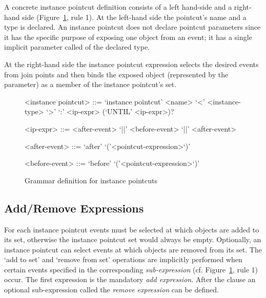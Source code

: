 A concrete instance pointcut definition consists of a left hand-side and a right-hand side (Figure~\ref{fig:grammar1}, rule 1).
At the left-hand side the pointcut's name and a type is declared.
An instance pointcut does not declare pointcut parameters since it has the specific purpose of exposing one object from an event; it has a single implicit parameter called  of the declared type.

At the right-hand side the instance pointcut expression selects the desired events from join points and then binds the exposed object (represented by the  parameter) as a member of the instance pointcut's set.

\begin{figure}[h!]
\begin{grammar}
<instance pointcut> ::= `instance pointcut' <name> `<' <instance-type> `>' `:'
<ip-expr> (`UNTIL' <ip-expr>)?

<ip-expr> ::= <after-event> `||' <before-event>  `||' <after-event>  

<after-event> ::= `after' `('<pointcut-expression>`)'

<before-event> ::= `before' `('<pointcut-expression>`)'
\end{grammar}
\caption{Grammar definition for instance pointcuts}
\label{fig:grammar1}
\end{figure}


\subsection{Add/Remove Expressions}
\label{sect:addrem}
For each instance pointcut events must be selected at which objects are added to its set, otherwise the instance pointcut set would always be empty.
Optionally, an instance pointcut can select events at which objects are removed from its set.
The `add to set' and `remove from set' operations are implicitly performed when certain events specified in the corresponding \emph{sub-expression} (cf. Figure~\ref{fig:grammar1}, rule 1) occur.
The first expression is the mandatory \emph{add expression}.
After the  clause an optional sub-expression called the \emph{remove expression} can be defined.

